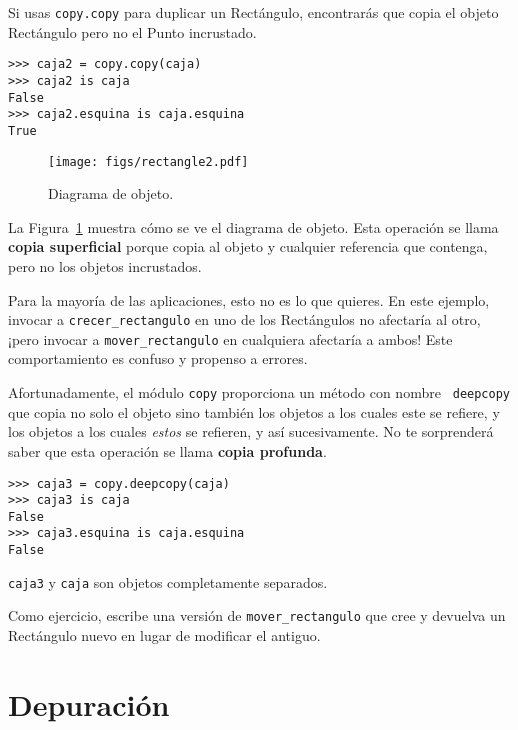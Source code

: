 \documentclass[10pt]{book}
\begin{document}

Si usas {\tt copy.copy} para duplicar un Rectángulo, encontrarás
que copia el objeto Rectángulo pero no el Punto incrustado.

\begin{verbatim}
>>> caja2 = copy.copy(caja)
>>> caja2 is caja
False
>>> caja2.esquina is caja.esquina
True
\end{verbatim}

\begin{figure}
\centerline
{\texttt{[image: figs/rectangle2.pdf]}}
\caption{Diagrama de objeto.}
\label{fig.rectangle2}
\end{figure}

La Figura~\ref{fig.rectangle2} muestra cómo se ve el diagrama de objeto.
Esta operación se llama {\bf copia superficial} porque copia al
objeto y cualquier referencia que contenga, pero no los objetos incrustados.

Para la mayoría de las aplicaciones, esto no es lo que quieres.  En este ejemplo,
invocar a \verb"crecer_rectangulo" en uno de los Rectángulos no
afectaría al otro, ¡pero invocar a \verb"mover_rectangulo" en cualquiera
afectaría a ambos!  Este comportamiento es confuso y propenso a errores.

Afortunadamente, el módulo {\tt copy} proporciona un método con nombre {\tt
deepcopy} que copia no solo el objeto sino también
los objetos a los cuales este se refiere, y los objetos a los cuales {\em estos} se refieren,
y así sucesivamente.
No te sorprenderá saber que esta operación se
llama {\bf copia profunda}.

\begin{verbatim}
>>> caja3 = copy.deepcopy(caja)
>>> caja3 is caja
False
>>> caja3.esquina is caja.esquina
False
\end{verbatim}
%
{\tt caja3} y {\tt caja} son objetos completamente separados.

Como ejercicio, escribe una versión de \verb"mover_rectangulo" que cree y
devuelva un Rectángulo nuevo en lugar de modificar el antiguo.


\section{Depuración}
\label{hasattr}
\end{document}
